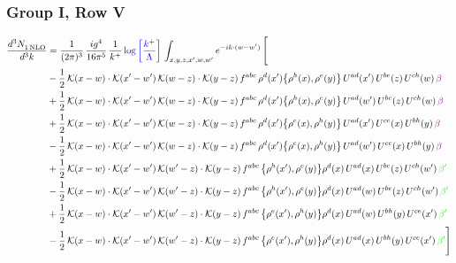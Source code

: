 \documentclass[9pt]{article}
\numberwithin{equation}{section}
\begin{document}
\subsubsection{Group I, Row V}
\begin{align}
    \frac{d^{3}N_{1\,\rm NLO}^{\rm}}{d^{3}k}  & = \frac{1}{(2\pi)^{3}}\, \frac{ig^{4}}{16\pi^{5}}\, \frac{1}{k^{+}}\, {\color{blue}\log{\left[\frac{k^{+}}{\Lambda}\right]}}\,\int_{x,y,z,x^{\prime},w,w^{\prime}}e^{-ik\cdot (w-w')}\, \Bigg[\notag \\ & -\frac{1}{2}\,\mathcal{K}(x-w)\cdot\mathcal{K}(x'-w')\,\mathcal{K}(w-z)\cdot\mathcal{K}(y-z)\, f^{abc}\,\rho^{d}(x')\big\{\rho^{h}(x),\rho^{e}(y)\big\}\,U^{ad}(x')\,U^{be}(z)\,U^{ch}(w)\,{\color{violet} \beta}\notag\\ & +\frac{1}{2}\,\mathcal{K}(x-w)\cdot\mathcal{K}(x'-w')\,\mathcal{K}(w-z)\cdot\mathcal{K}(y-z)\, f^{abc}\,\rho^{d}(x')\big\{\rho^{h}(x),\rho^{e}(y)\big\}\,U^{ad}(w')\,U^{be}(z)\,U^{ch}(w)\,{\color{violet} \beta}\notag\\ &+\frac{1}{2}\,\mathcal{K}(x-w)\cdot\mathcal{K}(x'-w')\,\mathcal{K}(w-z)\cdot\mathcal{K}(y-z)\, f^{abc}\,\rho^{d}(x')\big\{\rho^{e}(x),\rho^{h}(y)\big\}\,U^{ad}(x')\,U^{ce}(x)\,U^{bh}(y)\,{\color{violet} \beta}\notag\\ & -\frac{1}{2}\,\mathcal{K}(x-w)\cdot\mathcal{K}(x'-w')\,\mathcal{K}(w-z)\cdot\mathcal{K}(y-z)\, f^{abc}\,\rho^{d}(x')\big\{\rho^{e}(x),\rho^{h}(y)\big\}\,U^{ad}(w')\,U^{ce}(x)\,U^{bh}(y)\,{\color{violet} \beta}\notag\\ & +\frac{1}{2}\,\mathcal{K}(x-w)\cdot\mathcal{K}(x'-w')\,\mathcal{K}(w'-z)\cdot\mathcal{K}(y-z)\, f^{abc}\,\big\{\rho^{h}(x'),\rho^{e}(y)\big\}\rho^{d}(x)\,U^{ad}(x)\,U^{be}(z)\,U^{ch}(w')\,{\color{green} \beta'}\notag\\ &-\frac{1}{2}\,\mathcal{K}(x-w)\cdot\mathcal{K}(x'-w')\,\mathcal{K}(w'-z)\cdot\mathcal{K}(y-z)\, f^{abc}\,\big\{\rho^{h}(x'),\rho^{e}(y)\big\}\rho^{d}(x)\,U^{ad}(w)\,U^{be}(z)\,U^{ch}(w')\,{\color{green} \beta'}\notag\\ & +\frac{1}{2}\,\mathcal{K}(x-w)\cdot\mathcal{K}(x'-w')\,\mathcal{K}(w'-z)\cdot\mathcal{K}(y-z)\, f^{abc}\,\big\{\rho^{e}(x'),\rho^{h}(y)\big\}\rho^{d}(x)\,U^{ad}(w)\,U^{bh}(y)\,U^{ce}(x')\,{\color{green} \beta'}\notag\\ &-\frac{1}{2}\,\mathcal{K}(x-w)\cdot\mathcal{K}(x'-w')\,\mathcal{K}(w'-z)\cdot\mathcal{K}(y-z)\, f^{abc}\,\big\{\rho^{e}(x'),\rho^{h}(y)\big\}\rho^{d}(x)\,U^{ad}(x)\,U^{bh}(y)\,U^{ce}(x')\,{\color{green} \beta'} \Bigg]
\end{align}
\end{document}
